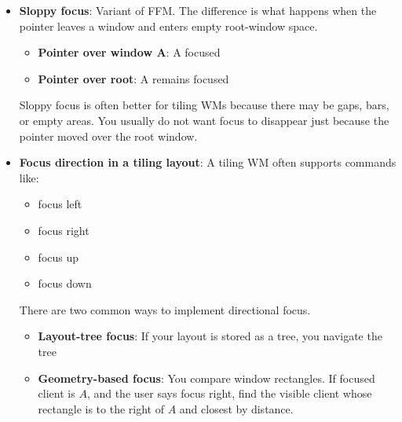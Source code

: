 \documentclass{report}
\begin{document}
\begin{itemize}
            \bigbreak \noindent 
            You do not want accidental focus changes caused by:
            \begin{itemize}
                \item Mapping a new window
                \item Unmapping a window
                \item Moving/resizing a window
                \item Grabbing/ungrabbing pointer
                \item Switching workspace
                \item Restacking windows
            \end{itemize}
            So a real implementation often filters enter events.
        \item \textbf{Sloppy focus}: Variant of FFM. The difference is what happens when the pointer leaves a window and enters empty root-window space.
            \begin{itemize}
                \item \textbf{Pointer over window A}: A focused
                \item \textbf{Pointer over root}: A remains focused
            \end{itemize}
            Sloppy focus is often better for tiling WMs because there may be gaps, bars, or empty areas. You usually do not want focus to disappear just because the pointer moved over the root window.
        \item \textbf{Focus direction in a tiling layout}: A tiling WM often supports commands like:
            \begin{itemize}
                \item focus left
                \item focus right
                \item focus up
                \item focus down
            \end{itemize}
            There are two common ways to implement directional focus.
            \begin{itemize}
                \item \textbf{Layout-tree focus}: If your layout is stored as a tree, you navigate the tree
                \item \textbf{Geometry-based focus}: You compare window rectangles. If focused client is $A$, and the user says focus right, find the visible client whose rectangle is to the right of $A$ and closest by distance.
            \end{itemize}
    \end{itemize}
\end{document}
